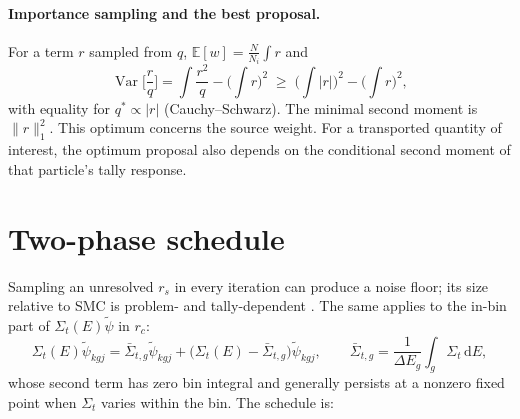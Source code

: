 \documentclass[11pt]{article}
\newcommand{\dd}{\,\mathrm{d}}
\newcommand{\E}{\mathbb{E}}
\newcommand{\Var}{\operatorname{Var}}
\newcommand{\tpsi}{\tilde\psi}
\newcommand{\Sigt}{\Sigma_t}
\begin{document}
\paragraph{Importance sampling and the best proposal.} For a term $r$ sampled from
$q$, $\E[w]=\frac{N}{N_i}\int r$ and
\begin{equation}
  \Var\Big[\frac{r}{q}\Big]=\int\frac{r^2}{q}-\Big(\int r\Big)^2
  \;\ge\;\Big(\int|r|\Big)^2-\Big(\int r\Big)^2,
  \label{eq:variance}
\end{equation}
with equality for $q^*\propto|r|$ (Cauchy--Schwarz). The minimal second moment is
$\|r\|_1^2$.
This optimum concerns the source weight. For a transported quantity of interest,
the optimum proposal also depends on the conditional second moment of that
particle's tally response.

\section{Two-phase schedule}
\label{sec:schedule}

Sampling an unresolved $r_s$ in every iteration can produce a noise floor; its size
relative to SMC is problem- and tally-dependent \cite{vermaak}. The same applies to the in-bin
part of $\Sigt(E)\tpsi$ in $r_c$:
\begin{equation}
  \Sigt(E)\tpsi_{kgj}=\bar\Sigma_{t,g}\tpsi_{kgj}+\big(\Sigt(E)-\bar\Sigma_{t,g}\big)\tpsi_{kgj},
  \qquad \bar\Sigma_{t,g}=\frac{1}{\Delta E_g}\int_g\Sigt\dd E,
\end{equation}
whose second term has zero bin integral and generally persists at a nonzero fixed
point when $\Sigt$ varies within the bin. The schedule is:
\end{document}
